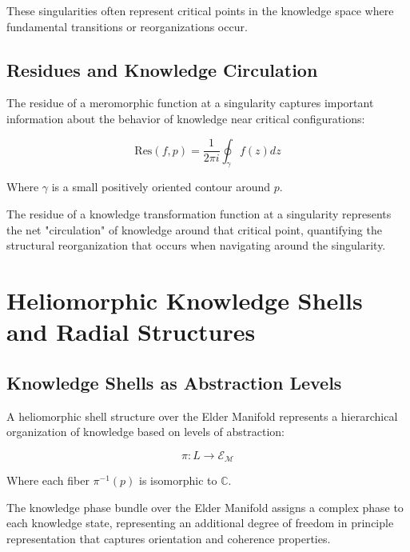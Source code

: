 These singularities often represent critical points in the knowledge space where fundamental transitions or reorganizations occur.

\subsection{Residues and Knowledge Circulation}

The residue of a meromorphic function at a singularity captures important information about the behavior of knowledge near critical configurations:

\begin{equation}
\text{Res}(f, p) = \frac{1}{2\pi i}\oint_{\gamma} f(z) dz
\end{equation}

Where $\gamma$ is a small positively oriented contour around $p$.

\begin{theorem}
The residue of a knowledge transformation function at a singularity represents the net "circulation" of knowledge around that critical point, quantifying the structural reorganization that occurs when navigating around the singularity.
\end{theorem}

\section{Heliomorphic Knowledge Shells and Radial Structures}

\subsection{Knowledge Shells as Abstraction Levels}

A heliomorphic shell structure over the Elder Manifold represents a hierarchical organization of knowledge based on levels of abstraction:

\begin{equation}
\pi: L \rightarrow \mathcal{E}_{\mathcal{M}}
\end{equation}

Where each fiber $\pi^{-1}(p)$ is isomorphic to $\mathbb{C}$.

\begin{definition}
The knowledge phase bundle over the Elder Manifold assigns a complex phase to each knowledge state, representing an additional degree of freedom in principle representation that captures orientation and coherence properties.
\end{definition}

